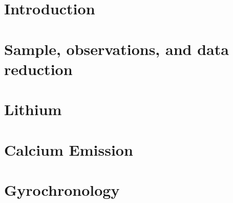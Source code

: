 \documentclass{aastex631}
\begin{document}

\section{Introduction} \label{sec:intro}




\section{Sample, observations, and data reduction} \label{sec:data}



\section{Lithium} \label{sec:lithium}




\section{Calcium Emission} \label{sec:rhk}



\section{Gyrochronology} \label{sec:gyro}
\end{document}
